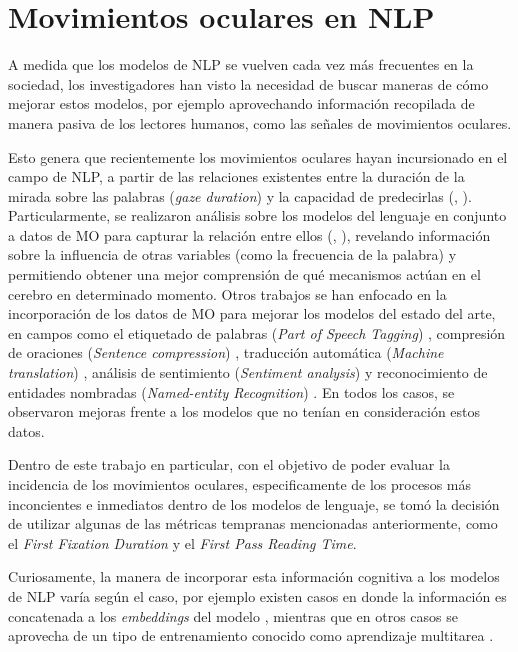\section{Movimientos oculares en NLP}

A medida que los modelos de NLP se vuelven cada vez más frecuentes en la sociedad, los investigadores han visto la necesidad de buscar maneras de cómo mejorar estos modelos, por ejemplo aprovechando información recopilada de manera pasiva de los lectores humanos, como las señales de movimientos oculares.

Esto genera que recientemente los movimientos oculares hayan incursionado en el campo de NLP, a partir de las relaciones existentes entre la duración de la mirada sobre las palabras (\textit{gaze duration}) y la capacidad de predecirlas (\cite{Rayner1998}, \cite{Reinhold2006}). Particularmente, se realizaron análisis sobre los modelos del lenguaje en conjunto a datos de MO para capturar la relación entre ellos (\cite{Bianchi2020}, \cite{Hofmann2017}), revelando información sobre la influencia de otras variables (como la frecuencia de la palabra) y permitiendo obtener una mejor comprensión de qué mecanismos actúan en el cerebro en determinado momento. Otros trabajos se han enfocado en la incorporación de los datos de MO para mejorar los modelos del estado del arte, en campos como el etiquetado de palabras (\textit{Part of Speech Tagging}) \parencite{barrett-etal-2016-weakly}, compresión de oraciones (\textit{Sentence compression}) \parencite{klerke2016improvingsentencecompressionlearning}, traducción automática (\textit{Machine translation}) \parencite{sajjad-etal-2016-eyes}, análisis de sentimiento (\textit{Sentiment analysis}) \parencite{mishra2017} y reconocimiento de entidades nombradas (\textit{Named-entity Recognition}) \parencite{hollenstein2019}. En todos los casos, se observaron mejoras frente a los modelos que no tenían en consideración estos datos.

Dentro de este trabajo en particular, con el objetivo de poder evaluar la incidencia de los movimientos oculares, especificamente de los procesos más inconcientes e inmediatos dentro de los modelos de lenguaje, se tomó la decisión de utilizar algunas de las métricas tempranas mencionadas anteriormente, como el \textit{First Fixation Duration} y el \textit{First Pass Reading Time}.

Curiosamente, la manera de incorporar esta información cognitiva a los modelos de NLP varía según el caso, por ejemplo existen casos en donde la información es concatenada a los \textit{embeddings} del modelo \parencite{hollenstein2019}, mientras que en otros casos se aprovecha de un tipo de entrenamiento conocido como aprendizaje multitarea \parencite{klerke2016improvingsentencecompressionlearning}.

